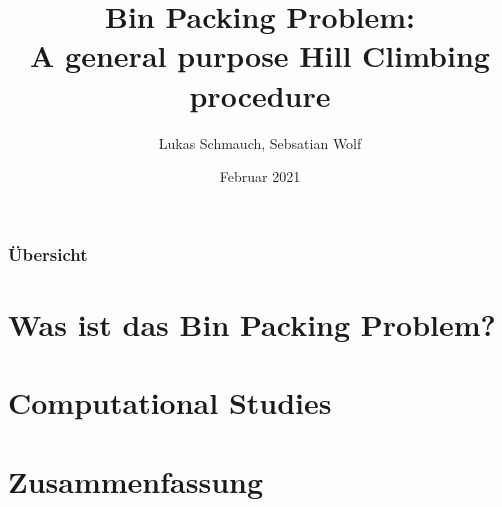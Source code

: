 \documentclass{beamer}
\title[BPP]{Bin Packing Problem:\\ A general purpose Hill Climbing procedure } %
\institute[FSU] %
{ 
Seminar Modern Heuristics \\
Dr. Rico Walter
}
\author{Lukas Schmauch, Sebsatian Wolf}
\date{Februar 2021} %
\begin{document}
\begin{frame}
\titlepage %
\end{frame}
\begin{frame}
\frametitle{Übersicht} 
\tableofcontents
\section{Was ist das Bin Packing Problem?} 
\section{Computational Studies}
\section{Zusammenfassung} 
\end{frame}
\end{document}
